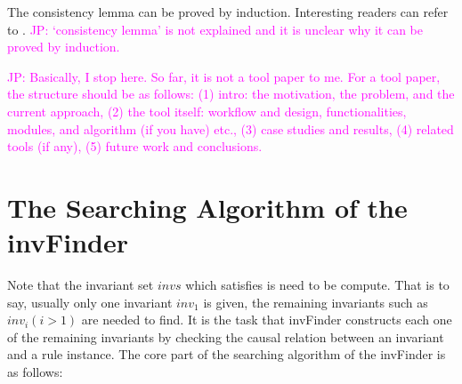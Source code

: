 \documentclass{llncs}
\newcommand\JP[1]{\textcolor{magenta}{JP: #1}}
\begin{document}
The consistency lemma can be proved by induction. Interesting
readers can refer to \cite{}. \JP{`consistency lemma' is not
explained and it is unclear why it can be proved by induction.}


\JP{Basically, I stop here. So far, it is not a tool paper to me.
For a tool paper, the structure should be as follows:
(1) intro: the motivation, the problem, and the current approach,
(2) the tool itself: workflow and design, functionalities, modules, and algorithm (if you have) etc.,
(3) case studies and results,
(4) related tools (if any),
(5) future work and conclusions.}

\section{The Searching Algorithm of the {\sf invFinder}}
Note that the invariant set $invs$ which satisfies is need to be
compute. That is to say, usually only one invariant $inv_1$ is
given, the remaining invariants such as $inv_i(i>1)$ are needed to
find. It is the task that {\sf invFinder} constructs each one of the
remaining invariants by checking the causal relation between an
invariant and a rule instance. The core part of the searching
algorithm of the {\sf invFinder} is as follows:
\end{document}
